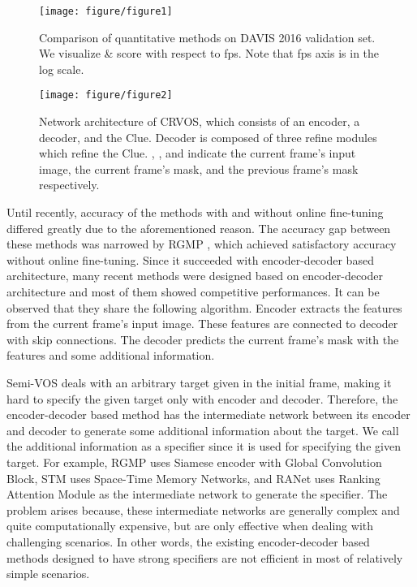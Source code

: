 \documentclass{article}
\begin{document}
\begin{figure}[t]
	\centering
	\texttt{[image: figure/figure1]}
	\caption{Comparison of quantitative methods on DAVIS 2016 validation set. We visualize \& score with respect to fps. Note that fps axis is in the log scale.}
	\label{figure1}
\end{figure}


\begin{figure*}[t]
	\centering
	\texttt{[image: figure/figure2]}
	\caption{Network architecture of CRVOS, which consists of an encoder, a decoder, and the Clue. Decoder is composed of three refine modules which refine the Clue. , , and  indicate the current frame's input image, the current frame's mask, and the previous frame's mask respectively.}
	\label{figure2}
\end{figure*}



Until recently, accuracy of the methods with and without online fine-tuning differed greatly due to the aforementioned reason. The accuracy gap between these methods was narrowed by RGMP \cite{wug2018fast}, which achieved satisfactory accuracy without online fine-tuning. Since it succeeded with encoder-decoder based architecture, many recent methods \cite{johnander2019generative, lin2019agss, zeng2019dmm, oh2019video, wang2019ranet} were designed based on encoder-decoder architecture and most of them showed competitive performances. It can be observed that they share the following algorithm. Encoder extracts the features from the current frame's input image. These features are connected to decoder with skip connections. The decoder predicts the current frame's mask with the features and some additional information. 



Semi-VOS deals with an arbitrary target given in the initial frame, making it hard to specify the given target only with encoder and decoder. Therefore, the encoder-decoder based method has the intermediate network between its encoder and decoder to generate some additional information about the target. We call the additional information as a specifier since it is used for specifying the given target. For example, RGMP \cite{wug2018fast} uses Siamese encoder with Global Convolution Block, STM \cite{oh2019video} uses Space-Time Memory Networks, and RANet \cite{wang2019ranet} uses Ranking Attention Module as the intermediate network to generate the specifier. The problem arises because, these intermediate networks are generally complex and quite computationally expensive, but are only effective when dealing with challenging scenarios. In other words, the existing encoder-decoder based methods designed to have strong specifiers are not efficient in most of relatively simple scenarios.
\end{document}
